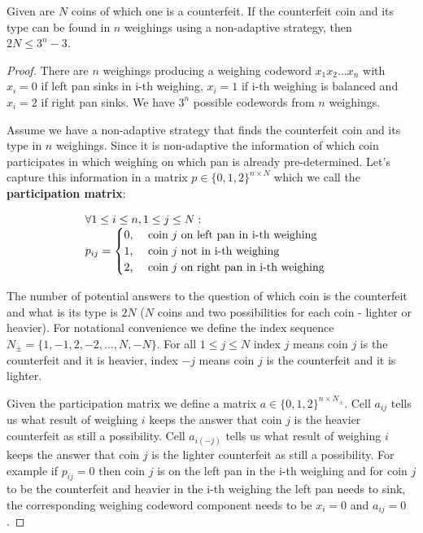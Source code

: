 \begin{thm}\label{coin_lower_bound}
Given are $N$ coins of which one is a counterfeit. If the counterfeit coin and its type can be found in $n$ weighings using a non-adaptive strategy, then $2 N \leq 3^n - 3$.
\end{thm}

\begin{proof}

There are $n$ weighings producing a weighing codeword $x_1 x_2 \ldots x_n$ with $x_i=0$ if left pan sinks in i-th weighing, $x_i=1$ if i-th weighing is balanced and $x_i=2$ if right pan sinks. We have $3^n$ possible codewords from $n$ weighings.

Assume we have a non-adaptive strategy that finds the counterfeit coin and its type in $n$ weighings. Since it is non-adaptive the information of which coin participates in which weighing on which pan is already pre-determined. Let's capture this information in a matrix $p \in \{0, 1, 2\}^{n \times N}$ which we call the \textbf{participation matrix}:

$$
\begin{array}{l}
\forall 1 \leq i \leq n, 1 \leq j \leq N: \\
p_{ij} = 
\begin{cases}
0 \text{,  \quad  coin $j$ on left pan in i-th weighing} \\
1 \text{,  \quad  coin $j$ not in i-th weighing} \\
2 \text{,  \quad  coin $j$ on right pan in i-th weighing}
\end{cases}
\end{array}
$$

The number of potential answers to the question of which coin is the counterfeit and what is its type is $2 N$ ($N$ coins and two possibilities for each coin - lighter or heavier). For notational convenience we define the index sequence $N_{\pm} = \{1, -1, 2, -2, \ldots , N, -N\}$. For all $1 \leq j \leq N$ index $j$ means coin $j$ is the counterfeit and it is heavier, index $-j$ means coin $j$ is the counterfeit and it is lighter.

Given the participation matrix we define a matrix $a \in \{0, 1, 2\}^{n \times N_{\pm}}$. Cell $a_{ij}$ tells us what result of weighing $i$ keeps the answer that coin $j$ is the heavier counterfeit as still a possibility. Cell $a_{i(-j)}$ tells us what result of weighing $i$ keeps the answer that coin $j$ is the lighter counterfeit as still a possibility. For example if $p_{ij} = 0$ then coin $j$ is on the left pan in the i-th weighing and for coin $j$ to be the counterfeit and heavier in the i-th weighing the left pan needs to sink, the corresponding weighing codeword component needs to be $x_i=0$ and $a_{ij} = 0$.


\end{proof}
